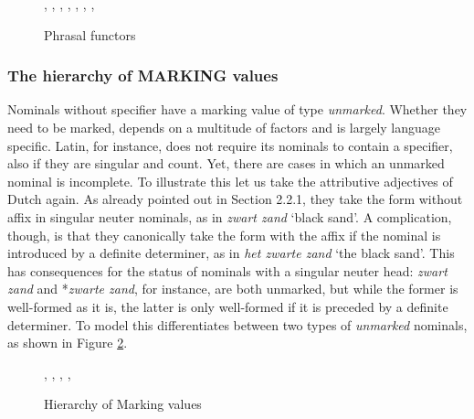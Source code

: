 \documentclass[output=paper]{langsci/langscibook}
\begin{document}
\begin{figure}  
\begin{center}
\scriptsize
\tree
  {,
    {,
      {,
        {}},
      {,
        {}}},
    {,
      {}}}
\caption{\label{glorie} Phrasal functors }
\normalsize
\end{center}
\end{figure}


\subsubsection{The hierarchy of MARKING values} 


Nominals without specifier have a {\sc marking} value of type {\it unmarked}. 
Whether they need to be marked, depends on a multitude of factors and is 
largely language specific. 
Latin, for instance, does not require its nominals to contain a specifier, also 
if they are singular and count. Yet, there are cases in which an unmarked nominal 
is incomplete.    
To illustrate this let us take the attributive adjectives of Dutch again. 
As already pointed out in Section 2.2.1, they take the form without affix in  
singular neuter nominals, as in {\it zwart zand\/} `black sand'. A complication, 
though, is that they canonically take the form with the affix if the nominal is  
introduced by a definite determiner, as in {\it het zwarte zand\/} `the black sand'. 
This has consequences for the status of nominals with a singular neuter head: 
{\it zwart zand\/} and *{\it zwarte zand}, for instance, are both unmarked, 
but while the former is well-formed as it is, the latter is only 
well-formed if it is preceded by a definite determiner. 
To model this \citet{VanEynde06} differentiates between two types 
of {\it unmarked\/} nominals, as shown in Figure \ref{bare}. 

\begin{figure}
\begin{center}
\footnotesize
\tree
{,
  {,  
    {},
    {}},
  {}}
\caption{\label{bare} Hierarchy of Marking values} 
\normalsize
\end{center}   
\end{figure}
\end{document}

